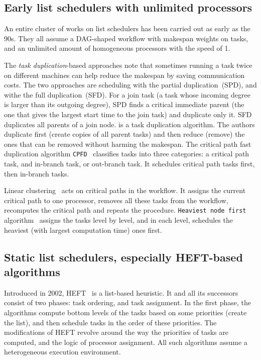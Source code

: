 \documentclass[conference]{IEEEtran}
\begin{document}
    \subsection{Early list schedulers with unlimited processors}
    An entire cluster of works on list schedulers has been carried out as early as the 90s.
    They all assume a DAG-shaped workflow with makespan weights on tasks, and an unlimited amount of homogeneous processors
    with the speed of 1.

    The \textit{task duplication}-based approaches note that sometimes running a task twice on different machines can
    help reduce the makespan by saving communication costs.
    The two approaches are scheduling with the partial duplication~(SPD), and withe the full duplication~(SFD).
    For a join task (a task whose incoming degree is larger than its outgoing degree), SPD finds a critical immediate
    parent (the one that gives the largest start time to the join task) and duplicate only it.
    SFD duplicates all parents of a join node.
    \cite{dfrn1997} is a task duplication algorithm.
    The authors duplicate first (create copies of all parent tasks) and then reduce (remove) the ones that can be removed without harming
    the makespan.
    The critical path fast duplication algorithm \texttt{CPFD}~\cite{5727760} classifies tasks into three categories: a critical
    path task, and in-branch task, or out-branch task.
    It schedules critical path tasks first, then in-branch tasks.

    Linear clustering~\cite{KWOK1999381} acts on critical paths in the workflow.
    It assigns the current critical path to one processor, removes all these tasks from the workflow, recomputes the critical
    path and repeats the procedure.
    \texttt{Heaviest node first} algorithm~\cite{SHIRAZI1990222} assigns the tasks level by level, and in each level,
    schedules the heaviest (with largest computation time)  ones first.


    \subsection{Static list schedulers, especially HEFT-based algorithms}

    Introduced in 2002, HEFT~\cite{topcuoglu2002performance} is a list-based heuristic.
    It and all its successors consist of two phases: task ordering, and task assignment.
    In the first phase, the algorithms compute bottom levels of the tasks based on some priorities (create the list),
    and then schedule tasks in the order of these priorities.
    The modifications of HEFT revolve around the way the priorities of tasks are computed, and the logic
    of processor assignment.
    All such algorithms assume a heterogeneous execution environment.
\end{document}
